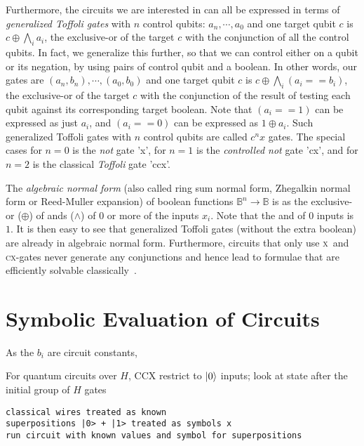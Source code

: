 \documentclass[sigplan,review]{acmart}
\newcommand{\x}{\textsc{x}}
\newcommand{\cx}{\textsc{cx}}
\newcommand{\Bool}{\ensuremath{\mathbb{B}}}
\begin{document}
Furthermore, the circuits we are interested in can all be expressed
in terms of \emph{generalized Toffoli gates} with $n$ control qubits:
$a_{n},\cdots,a_0$ and one target qubit $c$ is $c \oplus \bigwedge_i
a_i$, the exclusive-or of the target $c$ with the conjunction of all
the control qubits. In fact, we generalize this further, so that we
can control either on a qubit or its negation, by using pairs of
control qubit and a boolean. In other words, our gates are
$(a_{n}, b_{n}),\cdots,(a_0,b_0)$ and one target qubit $c$ is 
$c \oplus \bigwedge_i \left(a_i == b_i\right)$, the exclusive-or of the 
target $c$ with the conjunction of the result of testing each qubit
against its corresponding target boolean. Note that
$\left(a_i == 1\right)$ can be expressed as just $a_i$, and
$\left(a_i == 0\right)$ can be expressed as $1 \oplus a_i$.
Such generalized Toffoli gates with $n$ control qubits are called
$c^nx$ gates. The special cases
for $n=0$ is the \emph{not} gate 'x', 
for $n=1$ is the \emph{controlled not} gate 'cx', and
for $n=2$ is the classical \emph{Toffoli} gate 'ccx'.

The \emph{algebraic normal form} 
(also called ring sum normal form, Zhegalkin normal form or
Reed-Muller expansion)
of boolean functions $\Bool^n\rightarrow\Bool$
is as the exclusive-or ($\oplus$) of ands ($\wedge$) of $0$ or more
of the inputs $x_i$. Note that the and of $0$ inputs is $1$. It is then
easy to see that generalized Toffoli gates (without the extra boolean) are
already in algebraic normal form.
Furthermore, circuits that only
use \x\ and \cx-gates never generate any conjunctions and hence lead
to formulae that are efficiently solvable
classically~\cite{10.5555/35517,TOKAREVA20151}.


\section{Symbolic Evaluation of Circuits}

As the $b_i$ are circuit constants, 

For quantum circuits over $H$, CCX
restrict to $\ket{0}$ inputs; look at state after the initial group of
$H$ gates
\begin{verbatim}
classical wires treated as known
superpositions |0> + |1> treated as symbols x
run circuit with known values and symbol for superpositions
\end{verbatim}
\end{document}
